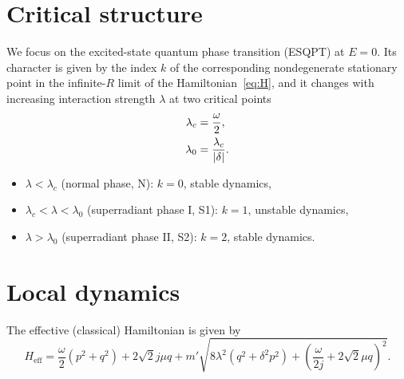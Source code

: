 \documentclass[a4paper,11pt,twoside]{article}
\begin{document}
\section{Critical structure}
	We focus on the excited-state quantum phase transition (ESQPT) at $E=0$.
	Its character is given by the index $k$ of the corresponding nondegenerate stationary point in the infinite-$R$ limit of the Hamiltonian~\eqref{eq:H}, and it changes with increasing interaction strength $\lambda$ at two critical points
	\begin{align}
		\lambda_{c}&=\frac{\omega}{2},\\
		\lambda_{0}&=\frac{\lambda_{c}}{\left|{\delta}\right|}.
	\end{align}
	\begin{itemize}
		\item $\lambda<\lambda_{c}$ (normal phase, N): $k=0$, stable dynamics,
		\item $\lambda_{c}<\lambda<\lambda_{0}$ (superradiant phase I, S1): $k=1$, unstable dynamics,
		\item $\lambda>\lambda_{0}$ (superradiant phase II, S2): $k=2$, stable dynamics.
	\end{itemize}

\section{Local dynamics}
The effective (classical) Hamiltonian is given by
\begin{equation}
	\label{eq:Hcl}
	H_{\mathrm{eff}}=\frac{\omega}{2}\left(p^{2}+q^{2}\right)+2\sqrt{2}j\mu q+m'\sqrt{8\lambda^{2}\left(q^{2}+\delta^{2}p^{2}\right)+\left(\frac{\omega}{2j}+2\sqrt{2}\mu q\right)^{2}}.
\end{equation}
\end{document}
